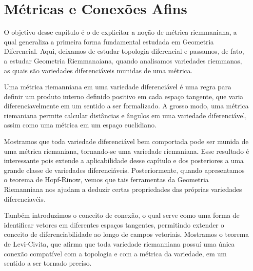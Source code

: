 
\chapter{Métricas e Conexões Afins}
\label{chap:metricas_e_conexoes_afins}

O objetivo desse capítulo é o de explicitar a noção de métrica riemmaniana, a qual generaliza a primeira forma fundamental estudada em Geometria Diferencial. Aqui, deixamos de estudar topologia diferencial e passamos, de fato, a estudar Geometria Riemmanaiana, quando analisamos variedades riemmanas, as quais são variedades diferenciáveis munidas de uma métrica.

Uma métrica riemanniana em uma variedade diferenciável é uma regra para definir um produto interno definido positivo em cada espaço tangente, que varia diferenciavelmente em um sentido a ser formalizado. A grosso modo, uma métrica riemaniana permite calcular distâncias e ângulos em uma variedade diferenciável, assim como uma métrica em um espaço euclidiano.

Mostramos que toda variedade diferenciável bem comportada pode ser munida de uma métrica riemaniana, tornando-se uma variedade riemaniana. Esse resultado é interessante pois extende a aplicabilidade desse capítulo e dos posteriores a uma grande classe de variedades diferenciáveis. Posteriormente, quando apresentamos o teorema de Hopf-Rinow, vemos que tais ferramentas da Geometria Riemanniana nos ajudam a deduzir certas propriedades das próprias variedades diferenciavéis.

Também introduzimos o conceito de conexão, o qual serve como uma forma de identificar vetores em diferentes espaços tangentes, permitindo extender o conceito de diferenciabilidade ao longo de campos vetoriais. Mostramos o teorema de Levi-Civita, que afirma que toda variedade riemanniana possuí uma única conexão compatível com a topologia e com a métrica da variedade, em um sentido a ser tornado preciso.
